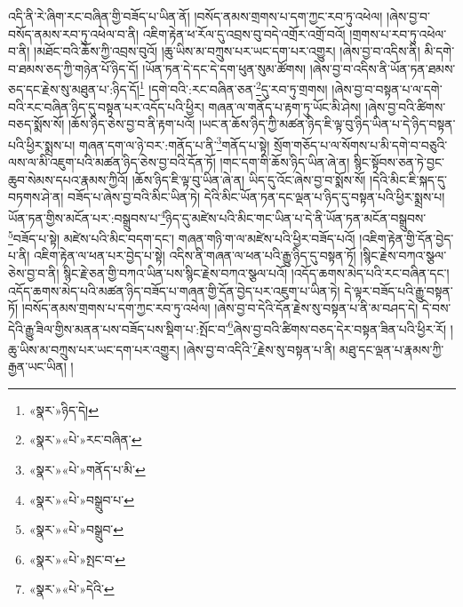 འདི་ནི་རེ་ཞིག་རང་བཞིན་གྱི་བཟོད་པ་ཡིན་ནོ། །བསོད་ནམས་གྲགས་པ་དག་ཀྱང་རབ་ཏུ་འཕེལ། །ཞེས་བྱ་བ་བསོད་ནམས་རབ་ཏུ་འཕེལ་བ་ནི། འཇིག་རྟེན་ཕ་རོལ་དུ་འབྲས་བུ་བདེ་འགྲོར་འགྲོ་བའོ། །གྲགས་པ་རབ་ཏུ་འཕེལ་བ་ནི། །མཐོང་བའི་ཆོས་ཀྱི་འབྲས་བུའོ། །ཆུ་ཡིས་མ་བཀྲུས་པར་ཡང་དག་པར་འགྱུར། །ཞེས་བྱ་བ་འདིས་ནི། མི་དགེ་བ་ཐམས་ཅད་ཀྱི་གཉེན་པོ་ཉིད་དོ། །ཡོན་ཏན་དེ་དང་དེ་དག་ཕུན་སུམ་ཚོགས། །ཞེས་བྱ་བ་འདིས་ནི་ཡོན་ཏན་ཐམས་ཅད་དང་རྗེས་སུ་མཐུན་པ་:ཉིད་དོ།\footnote{«སྣར་»ཉིད་དེ།} །དགེ་བའི་:རང་བཞིན་ཅན་\footnote{«སྣར་»«པེ་»རང་བཞིན་}དུ་རབ་ཏུ་གྲགས། །ཞེས་བྱ་བ་བསྟན་པ་ལ་དགེ་བའི་རང་བཞིན་ཉིད་དུ་བསྟན་པར་འདོད་པའི་ཕྱིར། གཞན་ལ་གནོད་པ་རྟག་ཏུ་ཡོང་མི་ཤེས། །ཞེས་བྱ་བའི་ཚིགས་བཅད་སྨོས་སོ། །ཆོས་ཉིད་ཅེས་བྱ་བ་ནི་རྟག་པའོ། །ཡང་ན་ཆོས་ཉིད་ཀྱི་མཚན་ཉིད་ཇི་ལྟ་བུ་ཉིད་ཡིན་པ་དེ་ཉིད་བསྟན་པའི་ཕྱིར་སྨྲས་པ། གཞན་དག་ལ་ཉེ་བར་:གནོད་པ་ནི་\footnote{«སྣར་»«པེ་»གནོད་པ་མི་}གནོད་པ་སྟེ། སྲོག་གཅོད་པ་ལ་སོགས་པ་མི་དགེ་བ་བཅུའི་ལས་ལ་མི་འཇུག་པའི་མཚན་ཉིད་ཅེས་བྱ་བའི་དོན་ཏོ། །གང་དག་གི་ཆོས་ཉིད་ཡིན་ཞེ་ན། སྙིང་སྟོབས་ཅན་ཏེ་བྱང་ཆུབ་སེམས་དཔའ་རྣམས་ཀྱིའོ། །ཆོས་ཉིད་ཇི་ལྟ་བུ་ཡིན་ཞེ་ན། ཡིད་དུ་འོང་ཞེས་བྱ་བ་སྨོས་སོ། །དེའི་མིང་ཇི་སྐད་དུ་བཏགས་ཤེ་ན། བཟོད་པ་ཞེས་བྱ་བའི་མིང་ཡིན་ཏེ། དེའི་མིང་ཡོན་ཏན་དང་ལྡན་པ་ཉིད་དུ་བསྟན་པའི་ཕྱིར་སྨྲས་པ། ཡོན་ཏན་གྱིས་མངོན་པར་:བསྒྲུབས་པ་\footnote{«སྣར་»«པེ་»བསྒྲུབ་པ་}ཉིད་དུ་མཛེས་པའི་མིང་གང་ཡིན་པ་དེ་ནི་ཡོན་ཏན་མངོན་བསྒྲུབས་\footnote{«སྣར་»«པེ་»བསྒྲུབ་}བཟོད་པ་སྟེ། མཛེས་པའི་མིང་བདག་དང་། གཞན་གཉི་ག་ལ་མཛེས་པའི་ཕྱིར་བཟོད་པའོ། །འཇིག་རྟེན་གྱི་དོན་བྱེད་པ་ནི། འཇིག་རྟེན་ལ་ཕན་པར་བྱེད་པ་སྟེ། འདིས་ནི་གཞན་ལ་ཕན་པའི་རྒྱུ་ཉིད་དུ་བསྟན་ཏོ། །སྙིང་རྗེས་བཀའ་སྩལ་ཅེས་བྱ་བ་ནི། སྙིང་རྗེ་ཅན་གྱི་བཀའ་ཡིན་པས་སྙིང་རྗེས་བཀའ་སྩལ་པའོ། །འདོད་ཆགས་མེད་པའི་རང་བཞིན་དང་། འདོད་ཆགས་མེད་པའི་མཚན་ཉིད་བཟོད་པ་གཞན་གྱི་དོན་བྱེད་པར་འཇུག་པ་ཡིན་ཏེ། དེ་ལྟར་བཟོད་པའི་རྒྱུ་བསྟན་ཏོ། །བསོད་ནམས་གྲགས་པ་དག་ཀྱང་རབ་ཏུ་འཕེལ། །ཞེས་བྱ་བ་དེའི་དོན་རྗེས་སུ་བསྟན་པ་ནི་མ་བཤད་དེ། དེ་བས་དེའི་རྒྱུ་ཟིལ་གྱིས་མནན་པས་བཟོད་པས་སྡིག་པ་:སྤོང་བ་\footnote{«སྣར་»«པེ་»སྤང་བ་}ཞེས་བྱ་བའི་ཚིགས་བཅད་དེར་བསྟན་ཟིན་པའི་ཕྱིར་རོ། །ཆུ་ཡིས་མ་བཀྲུས་པར་ཡང་དག་པར་འགྱུར། །ཞེས་བྱ་བ་འདིའི་\footnote{«སྣར་»«པེ་»དེའི་}རྗེས་སུ་བསྟན་པ་ནི། མཐུ་དང་ལྡན་པ་རྣམས་ཀྱི་རྒྱན་ཡང་ཡིན། །
